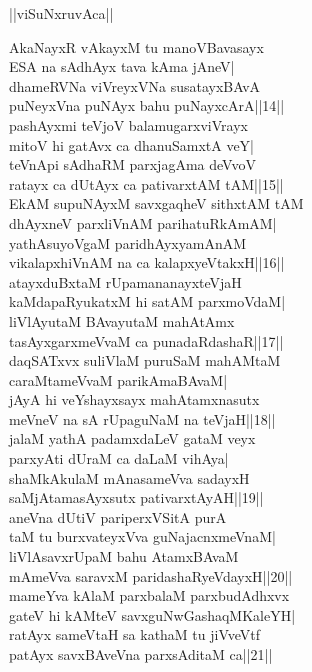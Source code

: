 \documentclass{article}
\begin{document}
\begin{center}
||viSuNxruvAca||
\end{center}

AkaNayxR vAkayxM tu manoVBavasayx\\
ESA na sAdhAyx tava kAma jAneV|\\
dhameRVNa viVreyxVNa susatayxBAvA\\
puNeyxVna puNAyx bahu puNayxcArA||14||\\
pashAyxmi teVjoV balamugarxviVrayx\\
mitoV hi gatAvx ca dhanuSamxtA veY|\\
teVnApi sAdhaRM parxjagAma deVvoV\\
ratayx ca dUtAyx ca pativarxtAM tAM||15||\\
EkAM supuNAyxM savxgaqheV sithxtAM tAM\\
dhAyxneV parxliVnAM parihatuRkAmAM|\\
yathAsuyoVgaM paridhAyxyamAnAM\\
vikalapxhiVnAM na ca kalapxyeVtakxH||16||\\
atayxduBxtaM rUpamananayxteVjaH\\
kaMdapaRyukatxM hi satAM parxmoVdaM|\\
liVlAyutaM BAvayutaM mahAtAmx\\
tasAyxgarxmeVvaM ca punadaRdashaR||17||\\
daqSATxvx suliVlaM puruSaM mahAMtaM\\
caraMtameVvaM parikAmaBAvaM|\\
jAyA hi veYshayxsayx mahAtamxnasutx\\
meVneV na sA rUpaguNaM na teVjaH||18||\\
jalaM yathA padamxdaLeV gataM veyx\\
parxyAti dUraM ca daLaM vihAya|\\
shaMkAkulaM mAnasameVva sadayxH\\
saMjAtamasAyxsutx pativarxtAyAH||19||\\
aneVna dUtiV pariperxVSitA purA\\
taM tu burxvateyxVva guNajacnxmeVnaM|\\
liVlAsavxrUpaM bahu AtamxBAvaM\\
mAmeVva saravxM paridashaRyeVdayxH||20||\\
mameYva kAlaM parxbalaM parxbudAdhxvx\\
gateV hi kAMteV savxguNwGashaqMKaleYH|\\
ratAyx sameVtaH sa kathaM tu jiVveVtf\\
patAyx savxBAveVna parxsAditaM ca||21||\\
\end{document}
